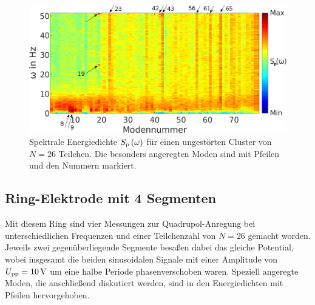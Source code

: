         \begin{figure}[!h]
          \centering
          \includegraphics[width=\textwidth]{figs/auswertung/manipulation/ersteungestpowerdens.png}
          \caption{Spektrale Energiedichte $S_\text{p}\left(\omega\right)$ für einen ungestörten Cluster von $N=26$ Teilchen. Die besonders angeregten Moden sind mit Pfeilen und den Nummern markiert.}\label{img:powerdensersteungest}
        \end{figure}

\vspace{-0.4cm}

        \subsection*{Ring-Elektrode mit 4 Segmenten}

          Mit diesem Ring sind vier Messungen zur Quadrupol-Anregung bei unterschiedlichen Frequenzen und einer Teilchenzahl von $N=26$ gemacht worden. Jeweils zwei gegenüberliegende Segmente besaßen dabei das gleiche Potential, wobei insgesamt die beiden sinusoidalen Signale mit einer Amplitude von $U\ix{pp}=\unit[10]{V}$ um eine halbe Periode phasenverschoben waren. Speziell angeregte Moden, die anschließend diskutiert werden, sind in den Energiedichten mit Pfeilen hervorgehoben.

